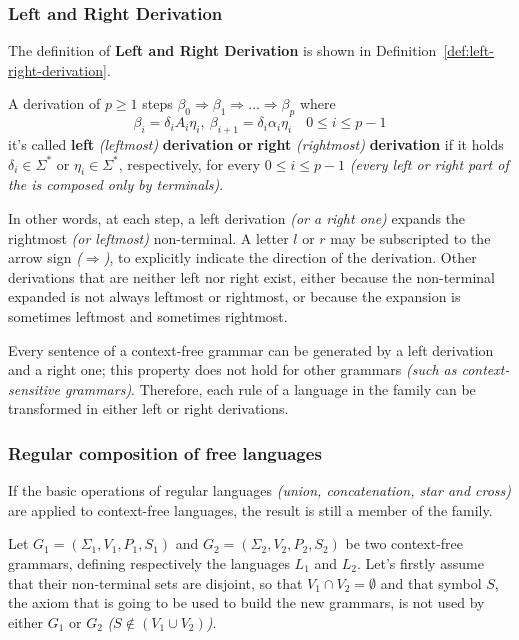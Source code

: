 \documentclass[english]{article}
\begin{document}
\subsubsection{Left and Right Derivation}
\label{sec:left-right-derivation}

The definition of \textbf{Left and Right Derivation} is shown in Definition~\ref{def:left-right-derivation}.

\begin{definition}
  \label{def:left-right-derivation}
  A derivation of \(p \geq 1\) steps \(\beta_0 \Rightarrow \beta_1 \Rightarrow \ldots \Rightarrow \beta_p\) where
  \[ \beta_i = \delta_i A_i \eta_i, \ \beta_{i+1} = \delta_i \alpha_i \eta_i \quad 0 \leq i \leq p-1 \]
  it's called \textbf{left} \textit{(leftmost)} \textbf{derivation} \textbf{or} \textbf{right} \textit{(rightmost)} \textbf{derivation} if it holds \(\delta_i \in \Sigma^\ast\) or \(\eta_i \in \Sigma^\ast\), respectively, for every \(0 \leq i \leq p-1\) \textit{(every left or right part of the \RP is composed only by terminals)}.
\end{definition}

In other words, at each step, a left derivation \textit{(or a right one)} expands the rightmost \textit{(or leftmost)} non-terminal.
A letter \(l\) or \(r\) may be subscripted to the arrow sign \textit{(\(\Rightarrow\))}, to explicitly indicate the direction of the derivation.
Other derivations that are neither left nor right exist, either because the non-terminal expanded is not always leftmost or rightmost, or because the expansion is sometimes leftmost and sometimes rightmost.

Every sentence of a context-free grammar can be generated by a left derivation and a right one;
this property does not hold for other grammars \textit{(such as context-sensitive grammars)}.
Therefore, each rule of a language in the \CF family can be transformed in either left or right derivations.

\subsubsection{Regular composition of free languages}

If the basic operations of regular languages \textit{(union, concatenation, star and cross)} are applied to context-free languages, the result is still a member of the \CF family.

Let \(G_1 = \left(\Sigma_1, V_1, P_1, S_1 \right)\) and \(G_2 = \left(\Sigma_2, V_2, P_2, S_2 \right)\) be two context-free grammars, defining respectively the languages \(L_1\) and \(L_2\).
Let's firstly assume that their non-terminal sets are disjoint, so that \(V_1 \cap V_2 = \emptyset\) and that symbol \(S\), the axiom that is going to be used to build the new grammars, is not used by either \(G_1\) or \(G_2\) \textit{(\(S \notin (V_1 \cup V_2)\))}.
\end{document}
